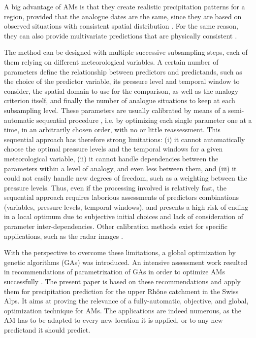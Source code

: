 \documentclass[review]{elsarticle}
\begin{document}
A big advantage of AMs is that they create realistic precipitation patterns for a region, provided that the analogue dates are the same, since they are based on observed situations with consistent spatial distribution \citep{Radanovics2013, Chardon2014}. For the same reason, they can also provide multivariate predictions that are physically consistent \citep{Raynaud2016b}.

The method can be designed with multiple successive subsampling steps, each of them relying on different meteorological variables. A certain number of parameters define the relationship between predictors and predictands, such as the choice of the predictor variable, its pressure level and temporal window to consider, the spatial domain to use for the comparison, as well as the analogy criterion itself, and finally the number of analogue situations to keep at each subsampling level. These parameters are usually calibrated by means of a semi-automatic sequential procedure \citep[see][for the details]{Bontron2004, Radanovics2013}, i.e. by optimizing each single parameter one at a time, in an arbitrarily chosen order, with no or little reassessment. This sequential approach has therefore strong limitations: (i) it cannot automatically choose the optimal pressure levels and the temporal windows for a given meteorological variable, (ii) it cannot handle dependencies between the parameters within a level of analogy, and even less between them, and (iii) it could not easily handle new degrees of freedom, such as a weighting between the pressure levels. Thus, even if the processing involved is relatively fast, the sequential approach requires laborious assessments of predictors combinations (variables, pressure levels, temporal windows), and presents a high risk of ending in a local optimum due to subjective initial choices and lack of consideration of parameter inter-dependencies. Other calibration methods exist for specific applications, such as the radar images \citep{Panziera2011, Foresti2015a}.

With the perspective to overcome these limitations, a global optimization by genetic algorithms (GAs) was introduced. An intensive assessment work resulted in recommendations of parametrization of GAs in order to optimize AMs successfully \citet{Horton2016}. The present paper is based on these recommendations and apply them for precipitation prediction for the upper Rh\^{o}ne catchment in the Swiss Alps. It aims at proving the relevance of a fully-automatic, objective, and global, optimization technique for AMs. The applications are indeed numerous, as the AM has to be adapted to every new location it is applied, or to any new predictand it should predict.
\end{document}
